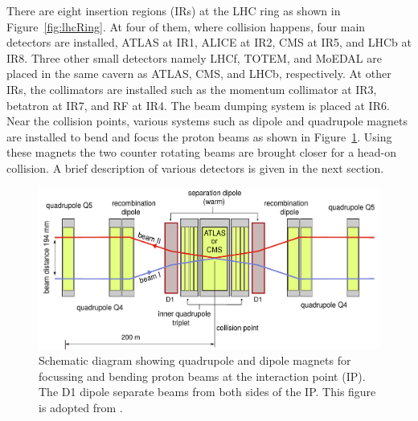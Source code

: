 There are eight insertion regions (IRs) at the LHC ring as shown in Figure~\ref{fig:lhcRing}. 
At four of them, where collision happens, four main detectors are installed,
ATLAS at IR1, ALICE at IR2, CMS at IR5, and LHCb at IR8. Three other small detectors namely 
LHCf, TOTEM, and MoEDAL are placed in the same cavern as ATLAS, CMS, and LHCb, 
respectively. At other IRs, the collimators are installed 
such as the momentum collimator at IR3, betatron at IR7, and RF at IR4. The beam dumping system 
is placed at IR6. Near the collision points, various systems such as dipole and quadrupole
magnets are installed to bend and focus the proton beams as shown in Figure~\ref{fig:lhc_beamBend}.
Using these magnets the two counter rotating beams are brought closer for a head-on
collision. A brief description of various detectors is given in the next section.
\begin{figure}
  \begin{center}
  \includegraphics[width=0.75\linewidth]{Experiment/LHC/Image/lhc_beamBend.pdf}
  \caption{Schematic diagram showing quadrupole and dipole magnets 
	  for focussing and bending proton beams at the interaction point (IP). 
	The D1 dipole separate beams from both sides of the IP. This figure is adopted 
	from \cite{Schmidt:2207171}.}
  \label{fig:lhc_beamBend}
  \end{center}
\end{figure}
